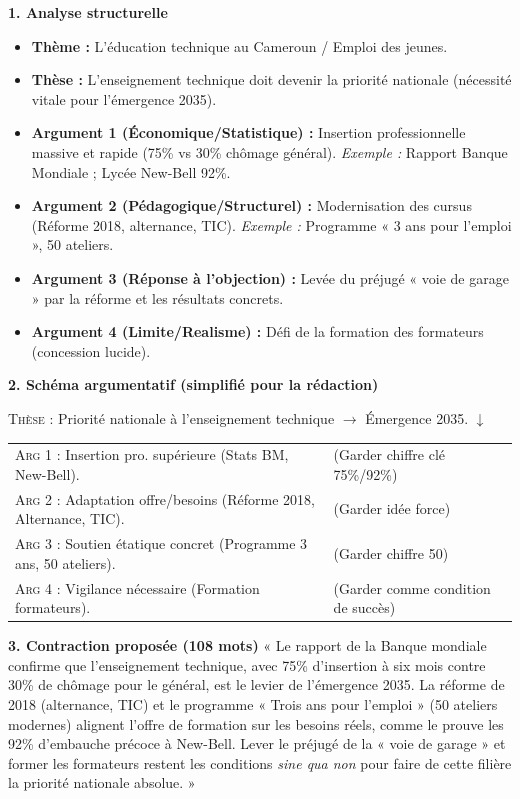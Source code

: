 \documentclass[11pt]{article}
\begin{document}
\begin{exoresolu}
\textbf{1. Analyse structurelle}
\begin{itemize}
    \item \textbf{Thème :} L'éducation technique au Cameroun / Emploi des jeunes.
    \item \textbf{Thèse :} L'enseignement technique doit devenir la priorité nationale (nécessité vitale pour l'émergence 2035).
    \item \textbf{Argument 1 (Économique/Statistique) :} Insertion professionnelle massive et rapide (75\% vs 30\% chômage général). \emph{Exemple :} Rapport Banque Mondiale ; Lycée New-Bell 92\%.
    \item \textbf{Argument 2 (Pédagogique/Structurel) :} Modernisation des cursus (Réforme 2018, alternance, TIC). \emph{Exemple :} Programme « 3 ans pour l'emploi », 50 ateliers.
    \item \textbf{Argument 3 (Réponse à l'objection) :} Levée du préjugé « voie de garage » par la réforme et les résultats concrets.
    \item \textbf{Argument 4 (Limite/Realisme) :} Défi de la formation des formateurs (concession lucide).
\end{itemize}

\textbf{2. Schéma argumentatif (simplifié pour la rédaction)}
\begin{center}
\textsc{Thèse} : Priorité nationale à l'enseignement technique $\rightarrow$ Émergence 2035.
$\downarrow$
\begin{tabular}{ll}
\textsc{Arg 1} : Insertion pro. supérieure (Stats BM, New-Bell). & (Garder chiffre clé 75\%/92\%) \\
\textsc{Arg 2} : Adaptation offre/besoins (Réforme 2018, Alternance, TIC). & (Garder idée force) \\
\textsc{Arg 3} : Soutien étatique concret (Programme 3 ans, 50 ateliers). & (Garder chiffre 50) \\
\textsc{Arg 4} : Vigilance nécessaire (Formation formateurs). & (Garder comme condition de succès)
\end{tabular}
\end{center}

\textbf{3. Contraction proposée (108 mots)}
« Le rapport de la Banque mondiale confirme que l'enseignement technique, avec 75\% d'insertion à six mois contre 30\% de chômage pour le général, est le levier de l'émergence 2035. La réforme de 2018 (alternance, TIC) et le programme « Trois ans pour l'emploi » (50 ateliers modernes) alignent l'offre de formation sur les besoins réels, comme le prouve les 92\% d'embauche précoce à New-Bell. Lever le préjugé de la « voie de garage » et former les formateurs restent les conditions \emph{sine qua non} pour faire de cette filière la priorité nationale absolue. »


\end{exoresolu}
\end{document}

